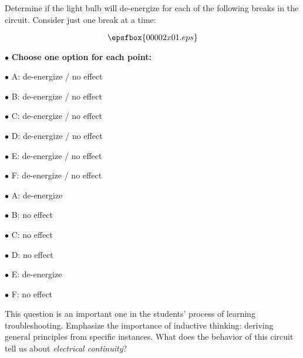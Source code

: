 

Determine if the light bulb will de-energize for each of the following breaks in the circuit.  Consider just one break at a time:

$$\epsfbox{00002x01.eps}$$

\medskip 
\item{$\bullet$} {\bf Choose one option for each point:}
\item{$\bullet$} A: de-energize / no effect
\item{$\bullet$} B: de-energize / no effect
\item{$\bullet$} C: de-energize / no effect
\item{$\bullet$} D: de-energize / no effect
\item{$\bullet$} E: de-energize / no effect
\item{$\bullet$} F: de-energize / no effect
\medskip 







\medskip 
\item{$\bullet$} A: de-energize
\item{$\bullet$} B: no effect
\item{$\bullet$} C: no effect
\item{$\bullet$} D: no effect
\item{$\bullet$} E: de-energize
\item{$\bullet$} F: no effect
\medskip 







This question is an important one in the students' process of learning troubleshooting.  Emphasize the importance of inductive thinking: deriving general principles from specific instances.  What does the behavior of this circuit tell us about {\it electrical continuity}?




